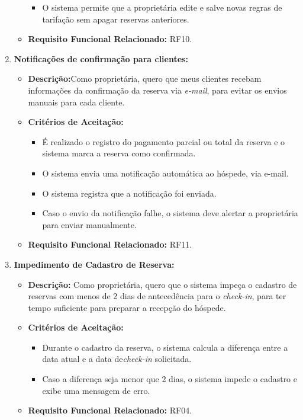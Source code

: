\documentclass[
	12pt,				%
	openany,			%
	oneside,			%
	a4paper,			%
	english,			%
	french,				%
	spanish,			%
	brazil				%
	]{abntex2}
\begin{document}
\begin{enumerate}[label=\textbf{\arabic*.}]
\begin{itemize}
\begin{itemize}
			\item O sistema permite que a proprietária edite e salve novas regras de tarifação sem apagar reservas anteriores.
		\end{itemize}
		\item \textbf{Requisito Funcional Relacionado:} RF10.
	\end{itemize} 
	\item \textbf{Notificações de confirmação para clientes:}
	\begin{itemize}
		\item \textbf{Descrição:}Como proprietária, quero que meus clientes recebam informações da confirmação da reserva via \textit{e-mail}, para evitar os envios manuais para cada cliente. 
		\item \textbf{Critérios de Aceitação:}
		\begin{itemize}
			\item É realizado o registro do pagamento parcial ou total da reserva e o sistema marca a reserva como confirmada.
			\item O sistema envia  uma notificação automática ao hóspede, via e-mail.
			\item O sistema registra que a notificação foi enviada.
			\item Caso o envio da notificação falhe, o sistema deve alertar a proprietária para enviar manualmente.
		\end{itemize}
		\item \textbf{Requisito Funcional Relacionado:} RF11.
	\end{itemize} 
	\item \textbf{Impedimento de Cadastro de Reserva:}
	\begin{itemize}
		\item \textbf{Descrição:} Como proprietária, quero que o sistema impeça o cadastro de reservas com menos de  2 dias de antecedência para o \textit{check-in}, para ter tempo suficiente para preparar a recepção do hóspede.
		\item \textbf{Critérios de Aceitação:}
		\begin{itemize}
			\item Durante o cadastro da reserva, o sistema calcula a diferença entre a data atual e a data de\textit{check-in} solicitada.
			\item Caso a diferença seja menor que 2 dias, o sistema impede o cadastro e exibe uma mensagem de erro.
		\end{itemize}
		\item \textbf{Requisito Funcional Relacionado:} RF04.

\end{itemize}
\end{enumerate}
\end{document}
